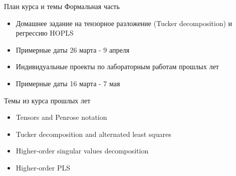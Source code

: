 
\usepackage{tikz}
\usepackage{amsmath}
\usepackage[english,russian]{babel}
\usepackage[labelformat=empty]{caption}

\usepackage{graphicx,animate}
\usepackage{animate}
\usepackage{svg}
\usepackage{subcaption}

\usepackage{ stmaryrd }

\usetikzlibrary{arrows,shapes,positioning,shadows,trees}
\newcommand*{\defeq}{\stackrel{\text{def}}{=}}
\newcommand{\tensor}[1]{\underline{\textbf{#1}}}
\newcommand{\M}[1]{\textbf{#1}}


\begin{frame}[plain]
\titlepage
\end{frame}
\begin{frame}{План курса и темы}
Формальная часть
\begin{itemize}
    \item Домашнее задание на тензорное разложение (Tucker decomposition) и регрессию HOPLS
    \item Примерные даты 26 марта - 9 апреля
    \item Индивидуальные проекты по лабораторным работам прошлых лет
    \item Примерные даты 16 марта - 7 мая
\end{itemize}

Темы из курса прошлых лет
\begin{itemize}
    \item Tensors and Penrose notation
    \item Tucker decomposition and alternated least squares
    \item Higher-order singular values decomposition
    \item Higher-order PLS
\end{itemize}
\end{frame}
